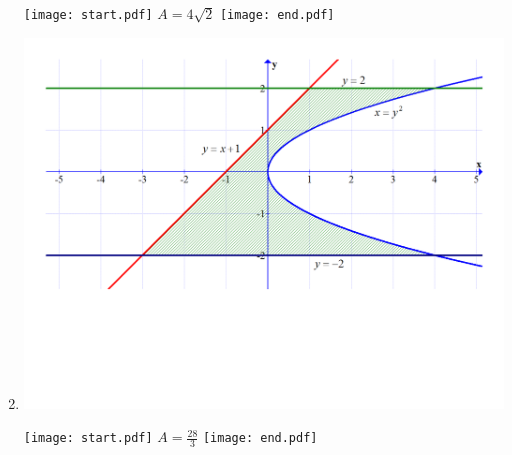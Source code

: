 \documentclass[12pt]{article}
\begin{document}
\begin{enumerate}
\begin{center}
\texttt{[image: start.pdf]}
{{$A=4\sqrt{2}$}}
\texttt{[image: end.pdf]}


\end{center}

\item \text{ }

\begin{center}

\includegraphics[scale=0.4]{graph4.pdf}

\texttt{[image: start.pdf]}
{{$A=\frac{28}{3}$}}
\texttt{[image: end.pdf]}


\end{center}

\end{enumerate}

\end{document}
